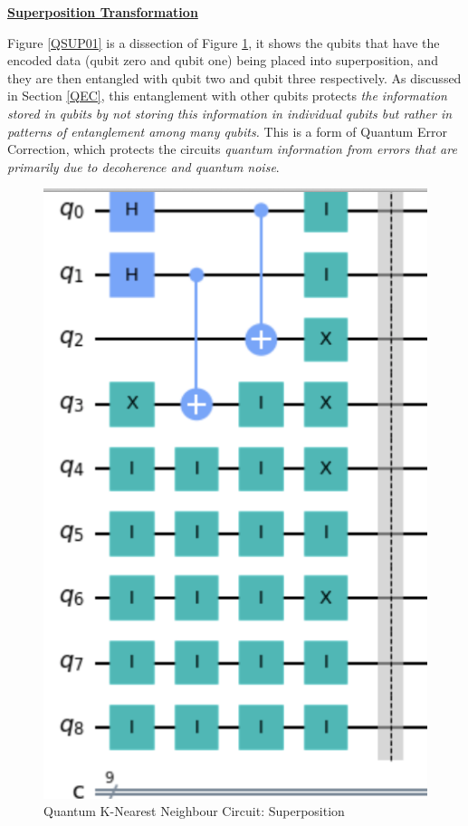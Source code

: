 \vspace{0.4cm}
\textbf{\underline{Superposition Transformation}}
\vspace{0.1cm}

Figure \ref{QSUP01} is a dissection of Figure \ref{QSUP}, it shows the qubits that have the encoded data (qubit zero and qubit one) being placed into superposition, and they are then entangled with qubit two and qubit three respectively. As discussed in Section \ref{QEC}, this entanglement with other qubits protects \emph{the information stored in qubits by not storing this information in individual qubits but rather in patterns of entanglement among many qubits.} This is a form of Quantum Error Correction, which protects the circuits \emph{quantum information from errors that are primarily due to decoherence and quantum noise}.

\begin{figure}[H]
      \centering
      \includegraphics[scale=0.2]{background/SuperPos.png}
      \caption{Quantum K-Nearest Neighbour Circuit: Superposition}
      \label{QSUP}
\end{figure}

